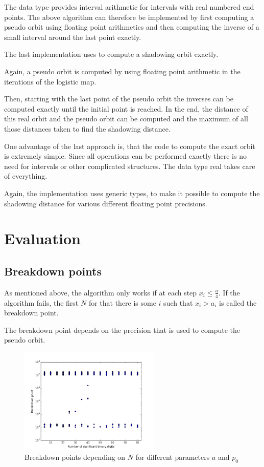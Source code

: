   The data type provides interval arithmetic for intervals with real numbered end points. 
  The above algorithm can therefore be implemented by first computing a pseudo
  orbit using floating point arithmetics and then computing the inverse of a
  small interval around the last point exactly.

  The last implementation uses \irram to compute a shadowing orbit exactly.

  Again, a pseudo orbit is computed by using floating point arithmetic in the
  iterations of the logistic map.

  Then, starting with the last point of the pseudo orbit the inverses can be computed exactly until the initial point is reached.
  In the end, the distance of this real orbit and the pseudo orbit can be
  computed and the maximum of all those distances taken to find the shadowing
  distance.

  One advantage of the last approach is, that the \irram code to compute the exact orbit is extremely simple. 
  Since all operations can be performed exactly there is no need for intervals
  or other complicated structures. 
  The data type real takes care of everything.

  Again, the implementation uses generic types, to make it possible to compute
  the shadowing distance for various different floating point precisions.
\section{Evaluation}
  \subsection{Breakdown points}
  As mentioned above, the algorithm only works if at each step $x_i \leq
  \frac{a}{4}$.  
  If the algorithm fails, the first $N$ for that there is some $i$ such that
  $x_i > a_i$ is called the breakdown point.

  The breakdown point depends on the precision that is used to compute the pseudo orbit. 
  \begin{figure}[h]
    \centering
    \includegraphics[width=0.6\textwidth]{img/dynamic_systems/breakdown}
    \caption{Breakdown points depending on $N$ for different parameters $a$ and
    $p_0$}\label{fig:breakdown}
  \end{figure}

